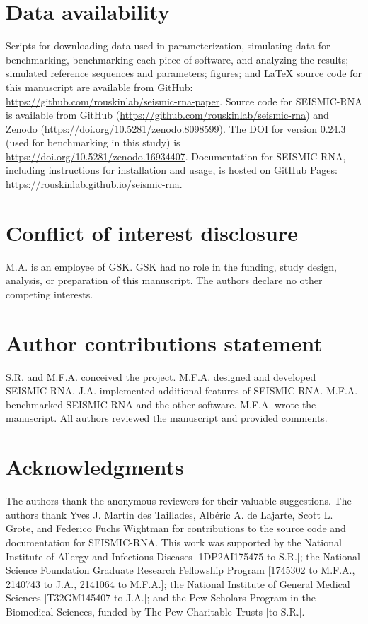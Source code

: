 \documentclass[11pt]{article}
\begin{document}
\section{Data availability}

Scripts for downloading data used in parameterization, simulating data for benchmarking, benchmarking each piece of software, and analyzing the results; simulated reference sequences and parameters; figures; and LaTeX source code for this manuscript are available from GitHub: \url{https://github.com/rouskinlab/seismic-rna-paper}.
Source code for SEISMIC-RNA is available from GitHub (\url{https://github.com/rouskinlab/seismic-rna}) and Zenodo (\url{https://doi.org/10.5281/zenodo.8098599}).
The DOI for version 0.24.3 (used for benchmarking in this study) is \url{https://doi.org/10.5281/zenodo.16934407}.
Documentation for SEISMIC-RNA, including instructions for installation and usage, is hosted on GitHub Pages: \url{https://rouskinlab.github.io/seismic-rna}.


\section{Conflict of interest disclosure}

M.A. is an employee of GSK.
GSK had no role in the funding, study design, analysis, or preparation of this manuscript.
The authors declare no other competing interests.


\section{Author contributions statement}

S.R. and M.F.A. conceived the project.
M.F.A. designed and developed SEISMIC-RNA.
J.A. implemented additional features of SEISMIC-RNA.
M.F.A. benchmarked SEISMIC-RNA and the other software.
M.F.A. wrote the manuscript.
All authors reviewed the manuscript and provided comments.


\section{Acknowledgments}

The authors thank the anonymous reviewers for their valuable suggestions.
The authors thank Yves J. Martin des Taillades, Albéric A. de Lajarte, Scott L. Grote, and Federico Fuchs Wightman for contributions to the source code and documentation for SEISMIC-RNA.
This work was supported by the National Institute of Allergy and Infectious Diseases [1DP2AI175475 to S.R.]; the National Science Foundation Graduate Research Fellowship Program [1745302 to M.F.A., 2140743 to J.A., 2141064 to M.F.A.]; the National Institute of General Medical Sciences [T32GM145407 to J.A.]; and the Pew Scholars Program in the Biomedical Sciences, funded by The Pew Charitable Trusts [to S.R.].
\end{document}
